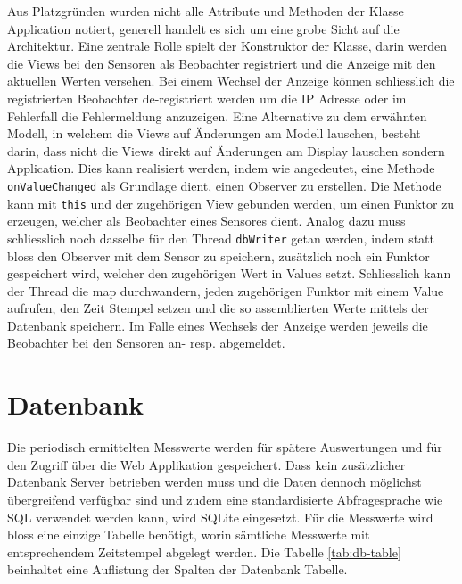 \documentclass[
    10pt,
    a4paper,
]{scrartcl}
\begin{document}
Aus Platzgründen wurden nicht alle Attribute und Methoden der Klasse Application
notiert, generell handelt es sich um eine grobe Sicht auf die Architektur. Eine zentrale
Rolle spielt der Konstruktor der Klasse, darin werden die Views bei den Sensoren als
Beobachter registriert und die Anzeige mit den aktuellen Werten versehen. Bei einem
Wechsel der Anzeige können schliesslich die registrierten Beobachter de-registriert werden
um die IP Adresse oder im Fehlerfall die Fehlermeldung anzuzeigen. Eine Alternative zu dem
erwähnten Modell, in welchem die Views auf Änderungen am Modell lauschen, besteht darin,
dass nicht die Views direkt auf Änderungen am Display lauschen sondern
Application. Dies kann realisiert werden, indem wie angedeutet, eine Methode
\texttt{onValueChanged} als Grundlage dient, einen Observer zu erstellen. Die Methode kann
mit \texttt{this} und der zugehörigen View gebunden werden, um einen Funktor zu erzeugen,
welcher als Beobachter eines Sensores dient. Analog dazu muss schliesslich noch dasselbe
für den Thread \texttt{dbWriter} getan werden, indem statt bloss den Observer mit dem
Sensor zu speichern, zusätzlich noch ein Funktor gespeichert wird, welcher den zugehörigen
Wert in Values setzt. Schliesslich kann der Thread die map durchwandern, jeden zugehörigen
Funktor mit einem Value aufrufen, den Zeit Stempel setzen und die so assemblierten Werte
mittels der Datenbank speichern. Im Falle eines Wechsels der Anzeige werden jeweils die
Beobachter bei den Sensoren an- resp. abgemeldet.

\section{Datenbank}
Die periodisch ermittelten Messwerte werden für spätere Auswertungen und für den Zugriff
über die Web Applikation gespeichert. Dass kein zusätzlicher Datenbank Server betrieben
werden muss und die Daten dennoch möglichst übergreifend verfügbar sind und zudem eine
standardisierte Abfragesprache wie SQL verwendet werden kann, wird SQLite eingesetzt. Für
die Messwerte wird bloss eine einzige Tabelle benötigt, worin sämtliche Messwerte mit
entsprechendem Zeitstempel abgelegt werden. Die Tabelle \ref{tab:db-table} beinhaltet eine
Auflistung der Spalten der Datenbank Tabelle.
\end{document}
